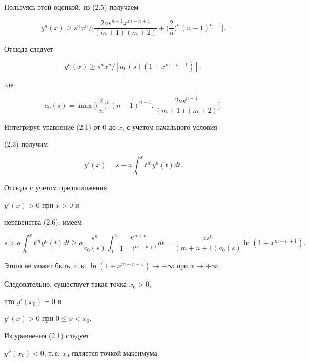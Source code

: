 \begin{pf}
\begin{multline*}
\end{multline*}


Пользуясь этой оценкой, из (2.5) получаем


$$


y^n(x) \ge s^nx^n\Big/ 


\bigg[\frac{2as^{n-1}x^{m+n+1}}{(m+1)(m+2)} + \bigg(\frac{2}{n}\bigg)^n


(n-1)^{n-1}\bigg].


$$


Отсюда следует


\begin{equation}


y^n(x) \ge s^nx^n/ [a_0(s)(1+x^{m+n+1})],


\end{equation}


где


$$


a_0(s) = \max\bigg[\bigg(\frac{2}{n}\bigg)^n(n-1)^{n-1},


\frac{2as^{n-1}}{(m+1)(m+2)}\bigg].


$$


Интегрируя уравнение (2.1) от $ 0 $ до $ x $, с учетом начального условия


(2.3) получим


$$


y'(x) = s-a\int_0^xt^my^n(t)dt.


$$


Отсюда с учетом предположения


$y'(x) > 0 $ при $x>0 $ и


неравенства (2.6), имеем


$$


s > a\int_0^xt^my^n(t)dt \ge


a\frac{s^n}{a_0(s)}\int_0^x \frac{t^{m+n}}{1+t^{m+n+1}}dt =


\frac{as^n}{(m+n+1)a_0(s)}\ln {(1 + x^{m+n+1})}.


$$


Этого не может быть, т.\,к. $ \ln {(1 + x^{m+n+1})}\to


+\infty $ при $ x\to + \infty$.


Следовательно, существует такая точка $ x_0 > 0 $, 


что $y'(x_0) = 0$ и 


$y'(x) > 0 $ при $ 0 \le x < x_0 $. 


Из уравнения (2.1) следует


$y''(x_0) < 0$, т.\,е. $ x_0 $ является точкой максимума 



\end{pf}

